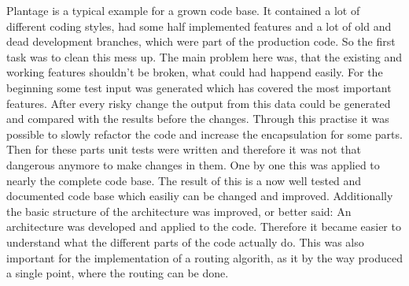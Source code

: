 Plantage is a typical example for a grown code base. It contained a lot of different coding styles, had some half implemented features and a lot of old and dead development branches, which were part of the production code. So the first task was to clean this mess up. The main problem here was, that the existing and working features shouldn't be broken, what could had happend easily. For the beginning some test input was generated which has covered the most important features. After every risky change the output from this data could be generated and compared with the results before the changes. Through this practise it was possible to slowly refactor the code and increase the encapsulation for some parts. Then for these parts unit tests were written and therefore it was not that dangerous anymore to make changes in them. One by one this was applied to nearly the complete code base. The result of this is a now well tested and documented code base which easiliy can be changed and improved. Additionally the basic structure of the architecture was improved, or better said: An architecture was developed and applied to the code. Therefore it became easier to understand what the different parts of the code actually do. This was also important for the implementation of a routing algorith, as it by the way produced a single point, where the routing can be done.